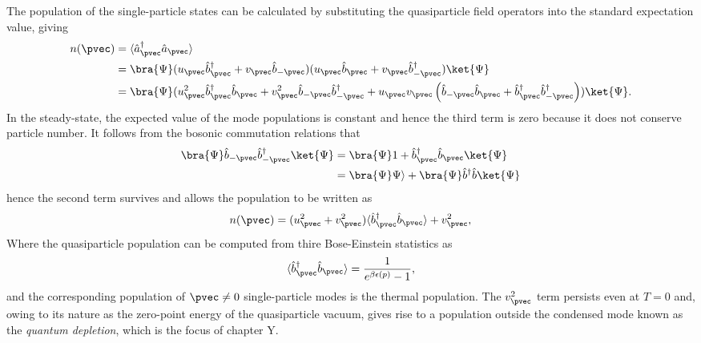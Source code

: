 	The population of the single-particle states can be calculated by substituting the quasiparticle field operators into the standard expectation value, giving
	\begin{align}
		n(\pvec) &= \langle\hat{a}^\dagger_\pvec \hat{a}_\pvec\rangle\\
		&= \bra{\Psi}(u_\pvec\hat{b}_\pvec^\dagger + v_\pvec \hat{b}_{-\pvec})(u_\pvec \hat{b}_\pvec + v_\pvec \hat{b}^\dagger_{-\pvec})\ket{\Psi}\\
		&=\bra{\Psi}(u_\pvec^2\hat{b}_\pvec^\dagger \hat{b}_\pvec  + v_\pvec^2 \hat{b}_{-\pvec} \hat{b}^\dagger_{-\pvec} + u_\pvec v_\pvec \left(\hat{b}_{-\pvec} \hat{b}_\pvec + \hat{b}_\pvec^\dagger  \hat{b}^\dagger_{-\pvec}\right))\ket{\Psi}.
	\end{align}
	In the steady-state, the expected value of the mode populations is constant and hence the third term is zero because it does not conserve particle number. It follows from the bosonic commutation relations that
	\begin{align}
		\bra{\Psi} \hat{b}_{-\pvec} \hat{b}^\dagger_{-\pvec}\ket{\Psi} &= \bra{\Psi} 1 + \hat{b}_\pvec^\dagger \hat{b}_\pvec\ket{\Psi}\\
								&= \bra{\Psi}\Psi\rangle  + \bra{\Psi}\hat{b}^\dagger \hat{b}\ket{\Psi}
	\end{align}
	hence the second term survives and allows the population to be written as
	\begin{equation}
		n(\pvec) = (u_\pvec^2+v_\pvec^2)\langle\hat{b}_\pvec^\dagger \hat{b}_\pvec\rangle + v_\pvec^2,
	\end{equation}
	Where the quasiparticle population can be computed from thire Bose-Einstein statistics as
	\begin{equation}
		\langle\hat{b}^\dagger_\pvec \hat{b}_\pvec\rangle = \frac{1}{e^{\beta \epsilon(p)}-1},
	\end{equation}
	and the corresponding population of $\pvec\neq0$ single-particle modes is the thermal population. The $v_\pvec^2$ term persists even at $T=0$ and, owing to its nature as the zero-point energy of the quasiparticle vacuum, gives rise to a population outside the condensed mode known as the \emph{quantum depletion}, which is the focus of chapter Y.


	
